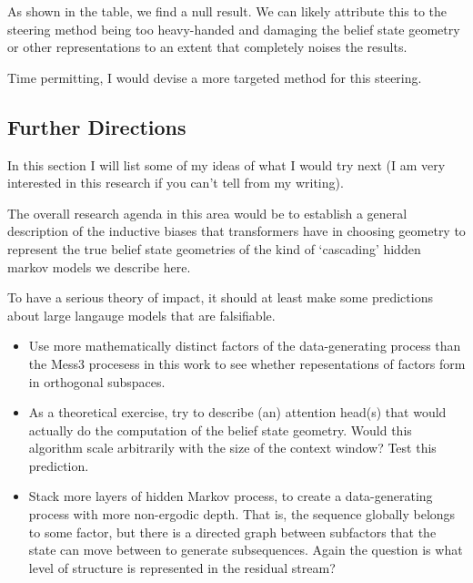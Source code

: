\documentclass[11pt,a4paper]{article}
\begin{document}
As shown in the table, we find a null result. We can likely attribute this to the steering method being too heavy-handed and damaging the belief state geometry or other representations to an extent that completely noises the results.


\vspace{5mm}

Time permitting, I would devise a more targeted method for this steering.
\subsection*{Further Directions}

In this section I will list some of my ideas of what I would try next (I am very interested in this research if you can't tell from my writing).

\vspace{3mm}

The overall research agenda in this area would be to establish a general description of the inductive biases that transformers have in choosing geometry to represent the true belief state geometries of the kind of `cascading' hidden markov models we describe here.


\vspace{3mm}
To have a serious theory of impact, it should at least make some predictions about large langauge models that are falsifiable.

\begin{itemize}
    \item Use more mathematically distinct factors of the data-generating process than the Mess3 procesess in this work to see whether repesentations of factors form in orthogonal subspaces.
    \item As a theoretical exercise, try to describe (an) attention head(s) that would actually do the computation of the belief state geometry. Would this algorithm scale arbitrarily with the size of the context window? Test this prediction.
    \item Stack more layers of hidden Markov process, to create a data-generating process with more non-ergodic depth. That is, the sequence globally belongs to some factor, but there is a directed graph between subfactors that the state can move between to generate subsequences. Again the question is what level of structure is represented in the residual stream?
\end{itemize}




\end{document}
